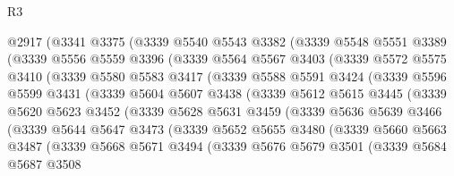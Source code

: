 \begin{lexlean}{R3}
\begin{coremodule}
    @2917
      (@3341
        @3375
        (@3339
          @5540
          @5543
          @3382
          (@3339
            @5548
            @5551
            @3389
            (@3339
              @5556
              @5559
              @3396
              (@3339
                @5564
                @5567
                @3403
                (@3339
                  @5572
                  @5575
                  @3410
                  (@3339
                    @5580
                    @5583
                    @3417
                    (@3339
                      @5588
                      @5591
                      @3424
                      (@3339
                        @5596
                        @5599
                        @3431
                        (@3339
                          @5604
                          @5607
                          @3438
                          (@3339
                            @5612
                            @5615
                            @3445
                            (@3339
                              @5620
                              @5623
                              @3452
                              (@3339
                                @5628
                                @5631
                                @3459
                                (@3339
                                  @5636
                                  @5639
                                  @3466
                                  (@3339
                                    @5644
                                    @5647
                                    @3473
                                    (@3339
                                      @5652
                                      @5655
                                      @3480
                                      (@3339
                                        @5660
                                        @5663
                                        @3487
                                        (@3339
                                          @5668
                                          @5671
                                          @3494
                                          (@3339
                                            @5676
                                            @5679
                                            @3501
                                            (@3339
                                              @5684
                                              @5687
                                              @3508

\end{coremodule}
\end{lexlean}

